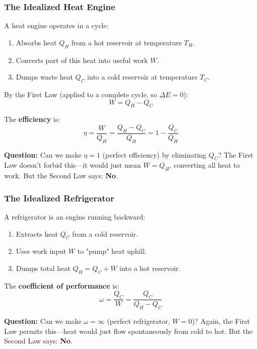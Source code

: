 \documentclass[9pt,twocoloumn]{article}
\begin{document}
\subsubsection{The Idealized Heat Engine}
A heat engine operates in a cycle:
\begin{enumerate}
    \item Absorbs heat $Q_H$ from a hot reservoir at temperature $T_H$.
    \item Converts part of this heat into useful work $W$.
    \item Dumps waste heat $Q_C$ into a cold reservoir at temperature $T_C$.
\end{enumerate}

By the First Law (applied to a complete cycle, so $\Delta E = 0$):
\begin{equation}
W = Q_H - Q_C
\end{equation}

The \textbf{efficiency} is:
\begin{equation}
\eta = \frac{W}{Q_H} = \frac{Q_H - Q_C}{Q_H} = 1 - \frac{Q_C}{Q_H}
\end{equation}

\textbf{Question:} Can we make $\eta = 1$ (perfect efficiency) by eliminating $Q_C$? The First Law doesn't forbid this—it would just mean $W = Q_H$, converting all heat to work. But the Second Law says: \textbf{No}.

\subsubsection{The Idealized Refrigerator}
A refrigerator is an engine running backward:
\begin{enumerate}
    \item Extracts heat $Q_C$ from a cold reservoir.
    \item Uses work input $W$ to "pump" heat uphill.
    \item Dumps total heat $Q_H = Q_C + W$ into a hot reservoir.
\end{enumerate}

The \textbf{coefficient of performance} is:
\begin{equation}
\omega = \frac{Q_C}{W} = \frac{Q_C}{Q_H - Q_C}
\end{equation}

\textbf{Question:} Can we make $\omega = \infty$ (perfect refrigerator, $W = 0$)? Again, the First Law permits this—heat would just flow spontaneously from cold to hot. But the Second Law says: \textbf{No}.
\end{document}

